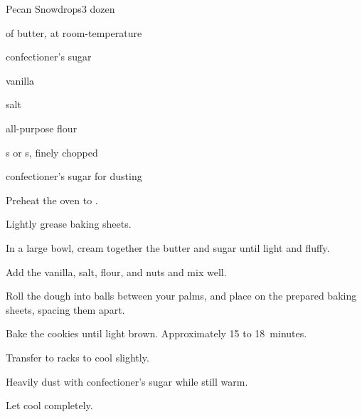 \begin{recipe}{Pecan Snowdrops}{}{3 dozen}

\begin{ingredients}
\item \C{\threequarter} of butter, at room-temperature
\item \C{\third} confectioner's sugar
\item {} vanilla
\item \tp{\eighth} salt
\item \C{1 \half} all-purpose flour
\item \C{\threequarter} s or s, finely chopped
\item confectioner's sugar for dusting
\end{ingredients}

\begin{directions}
\item Preheat the oven to .
\item Lightly grease baking sheets.
\item In a large bowl, cream together the butter and sugar until light and fluffy.
\item Add the vanilla, salt, flour, and nuts and mix well.
\item Roll the dough into \inch{\threequarter} balls between your palms, and place on the prepared baking sheets, spacing them \inch{1 \half} apart.
\item Bake the cookies until light brown. Approximately 15 to 18~minutes.
\item Transfer to racks to cool slightly.
\item Heavily dust with confectioner's sugar while still warm.
\item Let cool completely.
\end{directions}

\end{recipe}
